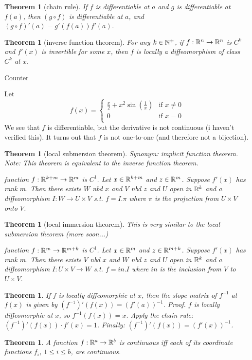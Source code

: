 \documentclass[11pt,leqno,oneside]{amsart}
\theoremstyle{mystyle} \newtheorem{thrm}[thm]{Theorem}
\theoremstyle{mystyle} \newtheorem{defi}[thm]{Definition}
\begin{document}
\begin{thrm}[chain rule]
	If $f$ is differentiable at $a$ and $g$ is differentiable at $f(a)$, then $(g \circ f)$ is differentiable at $a$, and $(g \circ f)'(a) = g'(f(a))f'(a)$.
\end{thrm}
\begin{thrm}[inverse function theorem]
	For any $k \in {\mathbb N}^+$, if $f:{\mathbb R}^n \to {\mathbb R}^n$ is $C^k$ and $f'(x)$ is invertible for some $x$, then $f$ is locally a diffeomorphism of class $C^k$ at $x$.
\end{thrm}
\begin{example}
	Counter\end{example}
\begin{example}
	Let $$f(x) =
	\begin{cases}
		\frac{x}{2} + x^2\sin\left(\frac 1x\right)	&\text{if $x \neq 0$} \\
		0											&\text{if $x=0$} \\
	\end{cases}
	$$  We see that $f$ is differentiable, but the derivative is not continuous (i haven't verified this).  It turns out that $f$ is not one-to-one (and therefore not a bijection).
\end{example}
\begin{thrm}[local submersion theorem]
	Synonym: implicit function theorem.
	Note: This theorem is equivalent to the inverse function theorem.

	function $f : {\mathbb R}^{k+m} \to {\mathbb R}^m$ is $C^1$.
	Let $x \in {\mathbb R}^{k+m}$ and $z \in {\mathbb R}^m$.
	Suppose $f'(x)$ has rank $m$.
	Then there exists $W$ nbd $x$ and $V$ nbd $z$ and $U$ open in ${\mathbb R}^k$ and a diffeomorphism $I : W \to U \times V$
	s.t. $f = I.\pi$ where $\pi$ is the projection from $U \times V$ onto $V$.
\end{thrm}
\begin{thrm}[local immersion theorem]
	This is very similar to the local submersion theorem (more soon...)

	function $f : {\mathbb R}^{m} \to {\mathbb R}^{m+k}$ is $C^1$.
	Let $x \in {\mathbb R}^{m}$ and $z \in {\mathbb R}^{m+k}$.
	Suppose $f'(x)$ has rank $m$.
	Then there exists $V$ nbd $x$ and $W$ nbd $z$ and $U$ open in ${\mathbb R}^k$ and a diffeomorphism $I : U \times V \to W$
	s.t. $f = in.I$ where $in$ is the inclusion from $V$ to $U \times V$.
\end{thrm}
\begin{thrm}
	If $f$ is locally diffeomorphic at $x$, then the slope matrix of $f^{-1}$ at $f(x)$ is given by $(f^{-1})'(f(x)) = (f'(a))^{-1}$.
	Proof. $f$ is locally diffeomorphic at $x$, so $f^{-1}(f(x)) = x$.
	Apply the chain rule: $(f^{-1})'(f(x)) \cdot f'(x) = 1$.
	Finally: $(f^{-1})'(f(x)) = (f'(x))^{-1}$.
\end{thrm}
\begin{thrm}
	A function $f : {\mathbb R}^a \to {\mathbb R}^b$ is continuous iff each of its coordinate functions $f_i$, $1\leq i \leq b$, are continuous.
\end{thrm}
\end{document}
